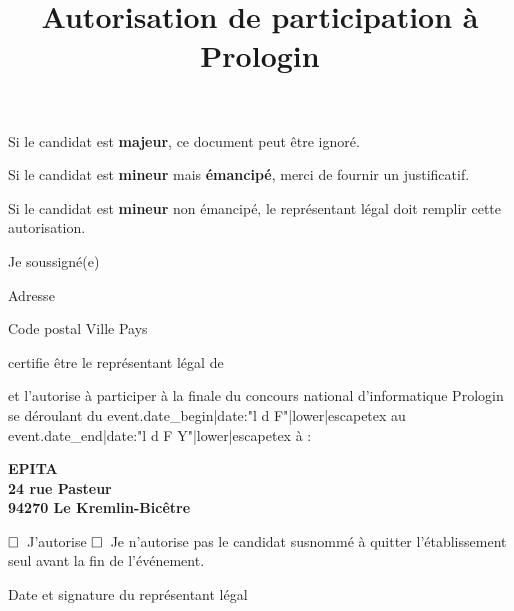 \documentclass[a4paper,11pt]{prologin}
\title{Autorisation de participation à Prologin}
\newcommand\checkbox{$\Huge\square$~}
\begin{document}
\begin{tcolorbox}
Si le candidat est \textbf{majeur}, ce document peut être ignoré.

Si le candidat est \textbf{mineur} mais \textbf{émancipé}, merci de fournir un justificatif.

Si le candidat est \textbf{mineur} non émancipé, le représentant légal doit remplir cette autorisation.
\end{tcolorbox}
\vspace{2.5\baselineskip}

Je soussigné(e) \hrulefill

Adresse \hrulefill

Code postal \hrulefill{} Ville \hrulefill\hrulefill\hrulefill{} Pays \hrulefill\hrulefill

certifie être le représentant légal de \hrulefill

et l'autorise à participer à la finale du concours national d'informatique Prologin se déroulant
du {{ event.date_begin|date:"l d F"|lower|escapetex }} au {{ event.date_end|date:"l d F Y"|lower|escapetex }} à :

\begin{center}
    \textbf{EPITA}\\
    \textbf{24 rue Pasteur}\\
    \textbf{94270 Le Kremlin-Bicêtre}
\end{center}

\checkbox J'autorise\hspace{1em} \checkbox Je n'autorise pas\hspace{1em} le
candidat susnommé à quitter l'établissement seul avant la fin de l'événement.

\begin{signatureframe}{Date et signature du représentant légal}\end{signatureframe}
\end{document}
